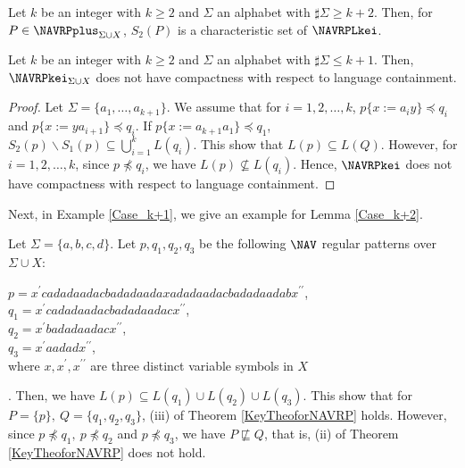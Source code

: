 \begin{col}
{\color{black}Let $k$ be an integer with $k\ge 2$ and $\Sigma$ an alphabet with $\sharp\Sigma \ge k+2$.}
Then, for {\color{black}$P \in \NAVRPplus_{\Sigma\cup X}$}, $S_{2}(P)$ is a characteristic set of $\NAVRPLkei$.
\end{col}

\begin{lem}\label{Case_k+2}
{\color{black}Let $k$ be an integer with $k\ge 2$ and $\Sigma$ an alphabet with $\sharp\Sigma \le k+1$.}
Then, $\NAVRPkei_{\Sigma\cup X}$ does not have compactness with respect to {\color{black} language }containment.
\end{lem}
\begin{proof}
Let $\Sigma = \{ a_{1}, \ldots , a_{k+1} \}$.
We assume that for $i=1,2,\ldots,k$, $p \{ x := a_{i}y \} \preceq q_{i}$ and $p \{ x := ya_{i+1} \} \preceq q_{i}$. 
If $p \{ x:= a_{k+1}a_{1} \} \preceq q_{1}$, $S_{2}(p) \backslash S_{1}(p) \subseteq \bigcup^{k}_{i=1} L(q_{i})$.
This show that $L(p) \subseteq L(Q)$.
However, for $i=1,2,\ldots,k$, since $p \not \preceq q_{i}$, we have $L(p) \not \subseteq L(q_{i})$.
Hence, $\NAVRPkei$ does not have compactness with respect to {\color{black} language }containment.
\end{proof}

Next, in Example \ref{Case_k+1}, we give an example for Lemma \ref{Case_k+2}.
\begin{ex}\label{Case_k+1}
{\color{black}Let $\Sigma=\{a,b,c,d\}$.
Let $p,q_{1},q_{2},q_{3}$ be the following $\NAV$ regular patterns over $\Sigma\cup X$:%

\noindent
$p  = x^{\prime}cadadaadacbadadaadaxadadaadacbadadaadabx^{\prime\prime}$,\\
$q_{1} = x^{\prime}cadadaadacbadadaadacx^{\prime\prime}$,\\
$q_{2} = x^{\prime}badadaadacx^{\prime\prime}$,\\
$q_{3} = x^{\prime}aadadx^{\prime\prime}$,\\
\noindent
where $x,x^{\prime},x^{\prime\prime}$ are three distinct variable symbols in $X$}.
Then, we have  $L(p) \subseteq L(q_{1}) \cup L(q_{2}) \cup L(q_{3})$.
This show that for $P=\{p\},~Q=\{q_{1},q_{2},q_{3}\}$, (iii) of Theorem \ref{KeyTheoforNAVRP} holds.
However, since $p \not \preceq q_{1},~p \not \preceq q_{2}$ and $p \not \preceq q_{3}$,
we have $P \not \sqsubseteq Q$, that is, (ii) of Theorem \ref{KeyTheoforNAVRP} does not hold.
\end{ex}

